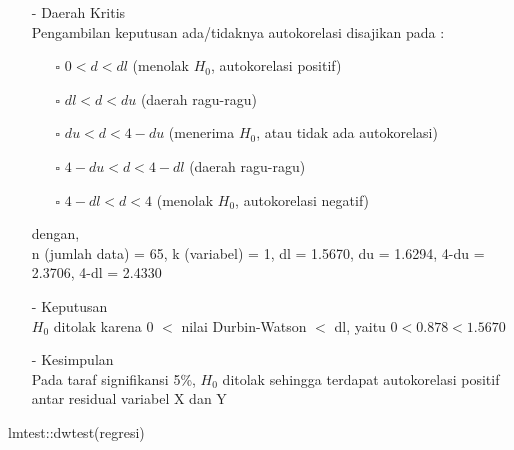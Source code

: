 \begin{enumerate}
\begin{enumerate}
\begin{test}
{\begin{enumerate}
        \item[-] Daerah Kritis \\
        Pengambilan keputusan ada/tidaknya autokorelasi disajikan pada :
        \begin{enumerate}
        \item[$\square$] $0 < d < dl$ (menolak $H_0$, autokorelasi positif)
        \item[$\square$] $dl < d < du$ (daerah ragu-ragu)
        \item[$\square$] $du < d < 4-du$ (menerima $H_0$, atau tidak ada autokorelasi)
        \item[$\square$] $4-du < d < 4-dl$ (daerah ragu-ragu)
        \item[$\square$] $4-dl < d < 4$ (menolak $H_0$, autokorelasi negatif)
        \end{enumerate}
        dengan, \\
        n (jumlah data) = 65, k (variabel) = 1, dl = 1.5670, du = 1.6294, 4-du = 2.3706, 4-dl = 2.4330
    
        \item[-] Keputusan \\
        $H_0$ ditolak karena 0 $<$ nilai Durbin-Watson $<$ dl, yaitu $0 < 0.878 < 1.5670$
    
        \item[-] Kesimpulan \\
        Pada taraf signifikansi 5\%, $H_0$ ditolak sehingga terdapat autokorelasi positif antar residual variabel X dan Y
    \end{enumerate}
    }
lmtest::dwtest(regresi)
    \end{test}

    \end{enumerate}


\end{enumerate}
